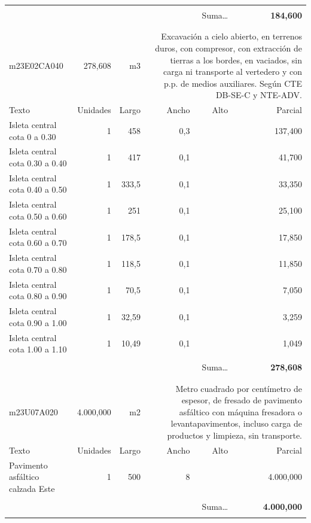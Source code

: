 \documentclass{book}%
\begin{document}
\begin{longtable}{lrrrrr}
&&&&&\\%
\multicolumn{5}{r}{Suma\ldots}&\textbf{   184,600}\\%
\hline%
&&&&&\\%
&&&&&\\%
m23E02CA040&   278,608& m3&\multicolumn{3}{p{6cm}}{\scriptsize Excavación a cielo abierto, en terrenos duros, con compresor, con extracción de tierras a los bordes, en vaciados, sin carga ni transporte al vertedero y con p.p. de medios auxiliares. Según CTE DB-SE-C y NTE-ADV.\normalsize}\\%
Texto&Unidades&Largo&Ancho&Alto&Parcial\\%
\hline%
\multicolumn{1}{p{3.5cm}}{Isleta central cota 0 a 0.30}&1&458&0,3&&   137,400\\%
\multicolumn{1}{p{3.5cm}}{Isleta central cota 0.30 a 0.40}&1&417&0,1&&    41,700\\%
\multicolumn{1}{p{3.5cm}}{Isleta central cota 0.40 a 0.50}&1&333,5&0,1&&    33,350\\%
\multicolumn{1}{p{3.5cm}}{Isleta central cota 0.50 a 0.60}&1&251&0,1&&    25,100\\%
\multicolumn{1}{p{3.5cm}}{Isleta central cota 0.60 a 0.70}&1&178,5&0,1&&    17,850\\%
\multicolumn{1}{p{3.5cm}}{Isleta central cota 0.70 a 0.80}&1&118,5&0,1&&    11,850\\%
\multicolumn{1}{p{3.5cm}}{Isleta central cota 0.80 a 0.90}&1&70,5&0,1&&     7,050\\%
\multicolumn{1}{p{3.5cm}}{Isleta central cota 0.90 a 1.00}&1&32,59&0,1&&     3,259\\%
\multicolumn{1}{p{3.5cm}}{Isleta central cota 1.00 a 1.10}&1&10,49&0,1&&     1,049\\%
&&&&&\\%
\multicolumn{5}{r}{Suma\ldots}&\textbf{   278,608}\\%
\hline%
&&&&&\\%
&&&&&\\%
m23U07A020& 4.000,000& m2&\multicolumn{3}{p{6cm}}{\scriptsize Metro cuadrado por centímetro de espesor, de fresado de pavimento asfáltico con máquina fresadora o levantapavimentos, incluso carga de productos y limpieza, sin transporte.\normalsize}\\%
Texto&Unidades&Largo&Ancho&Alto&Parcial\\%
\hline%
\multicolumn{1}{p{3.5cm}}{Pavimento asfáltico calzada Este}&1&500&8&& 4.000,000\\%
&&&&&\\%
\multicolumn{5}{r}{Suma\ldots}&\textbf{ 4.000,000}\\%
\hline%
&&&&&\\%
\end{longtable}%
\newpage
\end{document}
